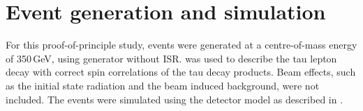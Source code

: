 






\section{Event generation and simulation}

For this proof-of-principle study, \eeZZQQ events were generated at a centre-of-mass energy of 350\,GeV, using \WHIZARD \cite{whizard} generator without ISR. \TAUOLA \cite{Jadach:1993hs} was used to describe the tau lepton decay with correct spin correlations of the tau decay products. Beam effects, such as the initial state radiation and the beam induced background, were not included. The \eeZZQQ events were simulated using the \ILD detector model as described in .



